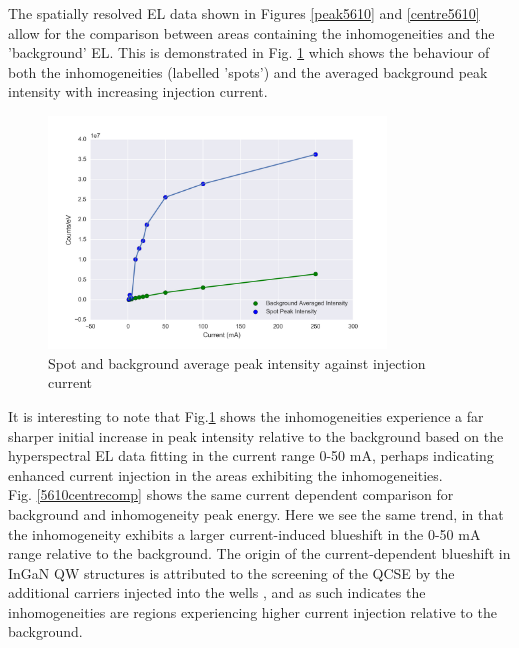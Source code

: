 The spatially resolved EL data shown in Figures \ref{peak5610} and \ref{centre5610} allow for the comparison between areas containing the inhomogeneities and the 'background' EL. This is demonstrated in Fig. \ref{5610peakcomp} which shows the behaviour of both the inhomogeneities (labelled 'spots') and the averaged background peak intensity with increasing injection current.
\begin{figure}[!ht]
	\centering
	\includegraphics[width=0.8\textwidth]{Figs/Ch3/Peakcomp5608.png}
	\caption[h] {Spot and background average peak intensity against injection current}
	\label{5610peakcomp}
\end{figure}

\FloatBarrier 
It is interesting to note that Fig.\ref{5610peakcomp} shows the inhomogeneities experience a far sharper initial increase in peak intensity relative to the background based on the hyperspectral EL data fitting in the current range 0-50 mA, perhaps indicating enhanced current injection in the areas exhibiting the inhomogeneities.\\
Fig. \ref{5610centrecomp} shows the same current dependent comparison for background and inhomogeneity peak energy. Here we see the same trend, in that the inhomogeneity exhibits a larger current-induced blueshift in the 0-50 mA range relative to the background. The origin of the current-dependent blueshift in InGaN QW structures is attributed to the screening of the QCSE by the additional carriers injected into the wells \cite{Ryou2009}, and as such indicates the inhomogeneities are regions experiencing higher current injection relative to the background.

